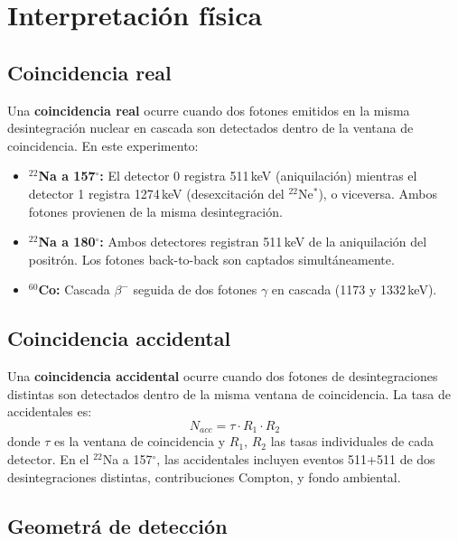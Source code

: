 \documentclass[12pt,a4paper]{article}
\begin{document}
\section{Interpretaci\'on f\'isica}

\subsection{Coincidencia real}

Una \textbf{coincidencia real} ocurre cuando dos fotones emitidos en la misma desintegraci\'on
nuclear en cascada son detectados dentro de la ventana de coincidencia. En este experimento:
\begin{itemize}
  \item \textbf{$^{22}$Na a 157$^\circ$:} El detector 0 registra 511\,keV (aniquilaci\'on)
        mientras el detector 1 registra 1274\,keV (desexcitaci\'on del $^{22}$Ne$^*$),
        o viceversa. Ambos fotones provienen de la misma desintegraci\'on.
  \item \textbf{$^{22}$Na a 180$^\circ$:} Ambos detectores registran 511\,keV de la
        aniquilaci\'on del positr\'on. Los fotones back-to-back son captados simult\'aneamente.
  \item \textbf{$^{60}$Co:} Cascada $\beta^-$ seguida de dos fotones $\gamma$ en
        cascada (1173 y 1332\,keV).
\end{itemize}

\subsection{Coincidencia accidental}

Una \textbf{coincidencia accidental} ocurre cuando dos fotones de desintegraciones distintas
son detectados dentro de la misma ventana de coincidencia. La tasa de accidentales es:
\begin{equation}
N_{acc} = \tau \cdot R_1 \cdot R_2
\end{equation}
donde $\tau$ es la ventana de coincidencia y $R_1$, $R_2$ las tasas individuales de cada detector.
En el $^{22}$Na a 157$^\circ$, las accidentales incluyen eventos 511+511 de dos desintegraciones
distintas, contribuciones Compton, y fondo ambiental.

\subsection{Geometr\'a de detecci\'on}
\end{document}
